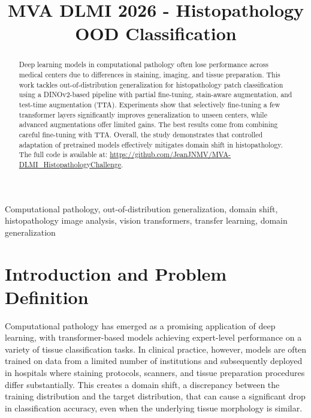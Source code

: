 \documentclass{midl}
\title[Histopathology OOD Classification]{MVA DLMI 2026 - Histopathology OOD Classification}
\begin{document}
\maketitle

\begin{abstract}

Deep learning models in computational pathology often lose performance across medical centers due to differences in staining, imaging, and tissue preparation. This work tackles out-of-distribution generalization for histopathology patch classification using a DINOv2-based pipeline with partial fine-tuning, stain-aware augmentation, and test-time augmentation (TTA).
Experiments show that selectively fine-tuning a few transformer layers significantly improves generalization to unseen centers, while advanced augmentations offer limited gains. The best results come from combining careful fine-tuning with TTA.
Overall, the study demonstrates that controlled adaptation of pretrained models effectively mitigates domain shift in histopathology. The full code is available at: \url{https://github.com/JeanJNMV/MVA-DLMI_HistopathologyChallenge}.

\end{abstract}

\begin{keywords}
Computational pathology, out-of-distribution generalization, domain shift, histopathology image analysis, vision transformers, transfer learning, domain generalization
\end{keywords}

\section{Introduction and Problem Definition}

Computational pathology has emerged as a promising application of deep learning, with transformer-based models achieving expert-level performance on a variety of tissue classification tasks. In clinical practice, however, models are often trained on data from a limited number of institutions and subsequently deployed in hospitals where staining protocols, scanners, and tissue preparation procedures differ substantially. This creates a domain shift, a discrepancy between the training distribution and the target distribution, that can cause a significant drop in classification accuracy, even when the underlying tissue morphology is similar. 
\end{document}
